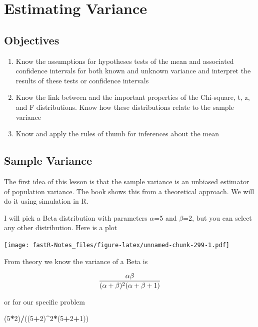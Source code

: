 \documentclass[]{book}
\newenvironment{Shaded}{\begin{snugshade}}{\end{snugshade}}
\newcommand{\DecValTok}[1]{\textcolor[rgb]{0.00,0.00,0.81}{#1}}
\newcommand{\OperatorTok}[1]{\textcolor[rgb]{0.81,0.36,0.00}{\textbf{#1}}}
\newcommand{\NormalTok}[1]{#1}
\providecommand{\tightlist}{%
  \setlength{\itemsep}{0pt}\setlength{\parskip}{0pt}}
\theoremstyle{definition}
\theoremstyle{definition}
\theoremstyle{definition}
\theoremstyle{remark}
\begin{document}
\hypertarget{L22}{\section{Estimating Variance}\label{L22}}

\subsection{Objectives}\label{objectives-21}

\begin{enumerate}
\def\labelenumi{\arabic{enumi}.}
\tightlist
\item
  Know the assumptions for hypotheses tests of the mean and associated
  confidence intervals for both known and unknown variance and interpret
  the results of these tests or confidence intervals\\
\item
  Know the link between and the important properties of the Chi-square,
  t, z, and F distributions. Know how these distributions relate to the
  sample variance\\
\item
  Know and apply the rules of thumb for inferences about the mean
\end{enumerate}

\subsection{Sample Variance}\label{sample-variance}

The first idea of this lesson is that the sample variance is an unbiased
estimator of population variance. The book shows this from a theoretical
approach. We will do it using simulation in R.

I will pick a Beta distribution with parameters \(\alpha\)=5 and
\(\beta\)=2, but you can select any other distribution. Here is a plot

\texttt{[image: fastR-Notes\_files/figure-latex/unnamed-chunk-299-1.pdf]}

From theory we know the variance of a Beta is

\[{\alpha \beta \over (\alpha + \beta)^{2}(\alpha + \beta +1)}\]

or for our specific problem

\begin{Shaded}
\begin{Highlighting}[]
\NormalTok{(}\DecValTok{5}\OperatorTok{*}\DecValTok{2}\NormalTok{)}\OperatorTok{/}\NormalTok{((}\DecValTok{5}\OperatorTok{+}\DecValTok{2}\NormalTok{)}\OperatorTok{^}\DecValTok{2}\OperatorTok{*}\NormalTok{(}\DecValTok{5}\OperatorTok{+}\DecValTok{2}\OperatorTok{+}\DecValTok{1}\NormalTok{))}
\end{Highlighting}
\end{Shaded}
\end{document}
